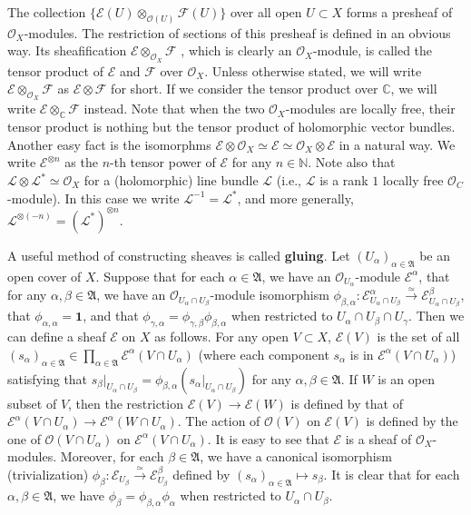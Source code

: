 \documentclass[12pt,a4paper,notitlepage]{report}
\theoremstyle{definition}
\theoremstyle{plain}
\newcommand{\fk}{\mathfrak}
\newcommand{\id}{\mathbf{1}}
\newcommand{\scr}{\mathscr}
\newcommand{\Cbb}{\mathbb C}
\numberwithin{equation}{section}
\begin{document}
The collection $\{\scr E(U)\otimes_{\scr O(U)}\scr F(U)\}$ over all open $U\subset X$ forms a presheaf of $\scr O_X$-modules. The restriction of sections of this presheaf is defined in an obvious way. Its sheafification  $\scr E\otimes_{\scr O_X}\scr F$ \index{EF@$\scr E\otimes_{\scr O_X}\scr F=\scr E\otimes\scr F$}, which is clearly an $\scr O_X$-module, is called the tensor product of $\scr E$ and $\scr F$ over $\scr O_X$. Unless otherwise stated, we will write $\scr E\otimes_{\scr O_X}\scr F$ as  $\scr E\otimes\scr F$ for short. If we consider the tensor product over $\Cbb$, we will write $\scr E\otimes_\Cbb\scr F$ instead. Note that when the two $\scr O_X$-modules are locally free, their tensor product is nothing but the tensor product of holomorphic vector bundles. Another easy fact is the isomorphms $\scr E\otimes\scr O_X\simeq\scr E\simeq\scr O_X\otimes\scr E$ in a natural way. We write $\scr E^{\otimes n}$ as the $n$-th tensor power of $\scr E$ \index{En@$\scr E^{\otimes n}$} for any $n\in\mathbb N$.  Note also that $\scr L\otimes \scr L^*\simeq\scr O_X$ for a (holomorphic) line bundle $\scr L$  (i.e., $\scr L$ is a  rank $1$ locally free $\scr O_C$-module). In this case we write $\scr L^{-1}=\scr L^*$, \index{L-1@$\scr L^{-1}$} and more generally, $\scr L^{\otimes(-n)}=(\scr L^*)^{\otimes n}$.


A useful method of constructing sheaves is called \textbf{gluing}. Let $(U_\alpha)_{\alpha\in\fk A}$ be an open cover of $X$. Suppose that for each $\alpha\in\fk A$, we have an $\scr O_{U_\alpha}$-module $\scr E^\alpha$, that for any $\alpha,\beta\in\fk A$, we have an $\scr O_{U_\alpha\cap U_\beta}$-module isomorphism $\phi_{\beta,\alpha}:\scr E^\alpha_{U_\alpha\cap U_\beta}\xrightarrow{\simeq}\scr E^\beta_{U_\alpha\cap U_\beta}$, that $\phi_{\alpha,\alpha}=\id$, and that $\phi_{\gamma,\alpha}=\phi_{\gamma,\beta}\phi_{\beta,\alpha}$ when restricted to $U_\alpha\cap U_\beta\cap U_\gamma$. Then we can define a sheaf $\scr E$ on $X$ as follows. For any open $V\subset X$, $\scr E(V)$ is the set of all $(s_\alpha)_{\alpha\in\fk A}\in\prod_{\alpha\in\fk A}\scr E^\alpha(V\cap U_\alpha)$ (where each component $s_\alpha$ is in $\scr E^\alpha(V\cap U_\alpha)$) satisfying that $s_\beta|_{U_\alpha\cap U_\beta}=\phi_{\beta,\alpha}(s_\alpha|_{U_\alpha\cap U_\beta})$ for any $\alpha,\beta\in\fk A$. If $W$ is an open subset of $V$, then the restriction $\scr E(V)\rightarrow\scr E(W)$ is defined by that of $\scr E^\alpha(V\cap U_\alpha)\rightarrow \scr E^\alpha(W\cap U_\alpha)$. The action of $\scr O(V)$ on $\scr E(V)$ is defined by the one of $\scr O(V\cap U_\alpha)$ on $\scr E^\alpha(V\cap U_\alpha)$. It is easy to see that $\scr E$ is a sheaf of $\scr O_X$-modules. Moreover, for each $\beta\in\fk A$, we have a canonical isomorphism (trivialization) $\phi_\beta:\scr E_{U_\beta}\xrightarrow{\simeq} \scr E^\beta_{U_\beta}$ defined by $(s_\alpha)_{\alpha\in\fk A}\mapsto s_\beta$. It is clear that for each $\alpha,\beta\in\fk A$, we have $\phi_\beta=\phi_{\beta,\alpha}\phi_\alpha$ when restricted to $U_\alpha\cap U_\beta$.
\end{document}
